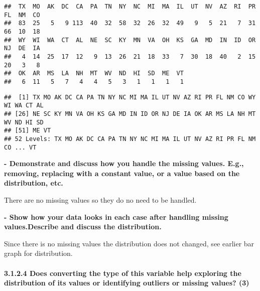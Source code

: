 \documentclass[
]{article}
\newenvironment{Shaded}{\begin{snugshade}}{\end{snugshade}}
\newcommand{\FunctionTok}[1]{\textcolor[rgb]{0.00,0.00,0.00}{#1}}
\newcommand{\NormalTok}[1]{#1}
\newcommand{\SpecialCharTok}[1]{\textcolor[rgb]{0.00,0.00,0.00}{#1}}
\begin{document}
\begin{verbatim}
##  TX  MO  AK  DC  CA  PA  TN  NY  NC  MI  MA  IL  UT  NV  AZ  RI  PR  FL  NM  CO 
##  83  25   5   9 113  40  32  58  32  26  32  49   9   5  21   7  31  66  10  18 
##  WY  WI  WA  CT  AL  NE  SC  KY  MN  VA  OH  KS  GA  MD  IN  ID  OR  NJ  DE  IA 
##   4  14  25  17  12   9  13  26  21  18  33   7  30  18  40   2  15  20   3   8 
##  OK  AR  MS  LA  NH  MT  WV  ND  HI  SD  ME  VT 
##   6  11   5   7   4   4   5   3   1   1   1   1
\end{verbatim}

\begin{Shaded}
\end{Shaded}

\begin{verbatim}
##  [1] TX MO AK DC CA PA TN NY NC MI MA IL UT NV AZ RI PR FL NM CO WY WI WA CT AL
## [26] NE SC KY MN VA OH KS GA MD IN ID OR NJ DE IA OK AR MS LA NH MT WV ND HI SD
## [51] ME VT
## 52 Levels: TX MO AK DC CA PA TN NY NC MI MA IL UT NV AZ RI PR FL NM CO ... VT
\end{verbatim}

\textbf{- Demonstrate and discuss how you handle the missing values.
E.g., removing, replacing with a constant value, or a value based on the
distribution, etc.}

There are no missing values so they do no need to be handled.

\textbf{- Show how your data looks in each case after handling missing
values.Describe and discuss the distribution.}

Since there is no missing values the distribution does not changed, see
earlier bar graph for distribution.

\hypertarget{does-converting-the-type-of-this-variable-help-exploring-the-distribution-of-its-values-or-identifying-outliers-or-missing-values-3}{%
\paragraph{3.1.2.4 Does converting the type of this variable help
exploring the distribution of its values or identifying outliers or
missing values?
(3)}\label{does-converting-the-type-of-this-variable-help-exploring-the-distribution-of-its-values-or-identifying-outliers-or-missing-values-3}}
\end{document}
